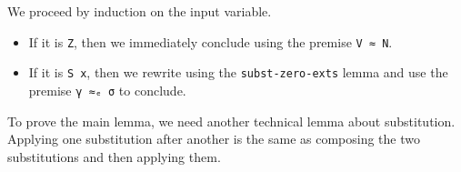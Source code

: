 We proceed by induction on the input variable.

\begin{itemize}
\item
  If it is \texttt{Z}, then we immediately conclude using the premise
  \texttt{V\ ≈\ N}.
\item
  If it is \texttt{S\ x}, then we rewrite using the
  \texttt{subst-zero-exts} lemma and use the premise \texttt{γ\ ≈ₑ\ σ}
  to conclude.
\end{itemize}

To prove the main lemma, we need another technical lemma about
substitution. Applying one substitution after another is the same as
composing the two substitutions and then applying them.

\begin{fence}
\begin{code}%
\>[0]\AgdaSpace{}%
\AgdaSymbol{:}\AgdaSpace{}%
\AgdaSpace{}%
\AgdaSpace{}%
\AgdaSymbol{\}\{}\AgdaSymbol{\}\{}\AgdaSpace{}%
\AgdaSymbol{:}\AgdaSpace{}%
\AgdaSpace{}%
\AgdaSpace{}%
\AgdaSymbol{\}}\AgdaSpace{}%
\AgdaSymbol{\{}\AgdaSpace{}%
\AgdaSymbol{:}\AgdaSpace{}%
\AgdaSpace{}%
\AgdaSpace{}%
\AgdaSymbol{\}\{}\AgdaSpace{}%
\AgdaSymbol{:}\AgdaSpace{}%
\AgdaSpace{}%
\AgdaSpace{}%
\AgdaSymbol{\}}\<%
\\
\>[0][@{}l@{\AgdaIndent{0}}]%
\>[2]\AgdaSpace{}%
\AgdaSpace{}%
\AgdaSpace{}%
\AgdaSymbol{(}\AgdaSpace{}%
\AgdaSpace{}%
\AgdaSymbol{)}\AgdaSpace{}%
\AgdaSpace{}%
\AgdaSpace{}%
\AgdaSymbol{(}\AgdaSpace{}%
\AgdaSpace{}%
\AgdaSpace{}%
\AgdaSymbol{)}\AgdaSpace{}%
\<%
\\
\>[0]\AgdaSpace{}%
\AgdaSymbol{\{}\AgdaSpace{}%
\AgdaSymbol{=}\AgdaSpace{}%
\AgdaSymbol{\}}\AgdaSpace{}%
\AgdaSymbol{=}\AgdaSpace{}%
\AgdaSpace{}%
\AgdaSymbol{\{}\AgdaSpace{}%
\AgdaSymbol{=}\AgdaSpace{}%
\AgdaSymbol{\}}\<%
\end{code}
\end{fence}

